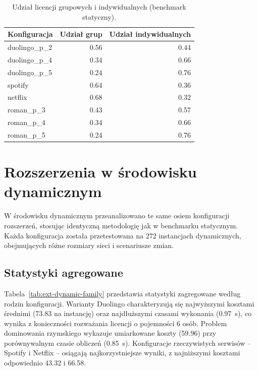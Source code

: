 \begin{table}[H]
  \centering
  \caption{Udział licencji grupowych i indywidualnych (benchmark statyczny).}
  \label{tab:ext-license-mix}
  \begin{tabular}{lrr}
    \toprule
    \textbf{Konfiguracja} & \textbf{Udział grup} & \textbf{Udział indywidualnych} \\
    \midrule
    duolingo\_p\_2        & 0.56                 & 0.44                           \\
    duolingo\_p\_4        & 0.34                 & 0.66                           \\
    duolingo\_p\_5        & 0.24                 & 0.76                           \\
    spotify               & 0.64                 & 0.36                           \\
    netflix               & 0.68                 & 0.32                           \\
    roman\_p\_3           & 0.43                 & 0.57                           \\
    roman\_p\_4           & 0.34                 & 0.66                           \\
    roman\_p\_5           & 0.24                 & 0.76                           \\
    \bottomrule
  \end{tabular}
\end{table}


\section{Rozszerzenia w środowisku dynamicznym}

W środowisku dynamicznym przeanalizowano te same osiem konfiguracji rozszerzeń, stosując identyczną metodologię jak w benchmarku statycznym. Każda konfiguracja została przetestowana na 272 instancjach dynamicznych, obejmujących różne rozmiary sieci i scenariusze zmian.

\subsection{Statystyki agregowane}

Tabela~\ref{tab:ext-dynamic-family} przedstawia statystyki zagregowane według rodzin konfiguracji. Warianty Duolingo charakteryzują się najwyższymi kosztami średnimi (73.83 na instancję) oraz najdłuższymi czasami wykonania (0.97~s), co wynika z konieczności rozważania licencji o pojemności 6 osób. Problem dominowania rzymskiego wykazuje umiarkowane koszty (59.96) przy porównywalnym czasie obliczeń (0.85~s). Konfiguracje rzeczywistych serwisów -- Spotify i Netflix -- osiągają najkorzystniejsze wyniki, z najniższymi kosztami odpowiednio 43.32 i 66.58.

